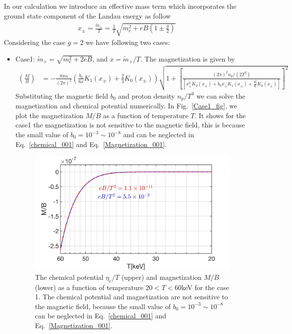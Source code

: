 \documentclass[Universe,article,submit,moreauthors,pdftex]{Definitions/mdpi}
\newcommand*{\req}[1]{Eq.~{\eqref{#1}}}
\newcommand*{\rf}[1]{Fig.~{\ref{#1}}}
\begin{document}
In our calculation we introduce an effective mass term which incorporates the ground state component of the Landau energy as follow
\begin{align}
x_\pm=\frac{\tilde{m}_\pm}{T}=\frac{1}{T}\sqrt{m^2_e+eB\left(1\pm\frac{g}{2}\right)}
\end{align}
Considering the case $g=2$ we have following two cases:
\begin{itemize}
  \item Case1: $\tilde m_+=\sqrt{m^2_e+2eB}$, and $x=\tilde m_+/T$. The magnetization is given by
  \begin{align}\label{Magnetization_001}
 \left(\frac{M}{B}\right)&=-\frac{8\pi\alpha}{(2\pi)^2}\left(\frac{b_0}{6x}K_1(x_\pm)+\frac{2}{3}K_0(x_\pm)\right)\sqrt{1+\left[\frac{{(2\pi)^2n_p}/{(2T^3)}}{\left[x_\pm^2K_2(x_\pm)+b_0x_\pm K_1(x_\pm)+\frac{b^2_0}{6}K_0(x_\pm)\right]}\right]^2}
   \end{align}
Substituting the magnetic field $b_0$ and proton density $n_p/T^3$  we can solve the magnetization and chemical potential numerically. In \rf{Case1_fig}, we plot the  magnetization $M/B$ as a function of temperature $T$. It shows for the case1 the magnetization is not sensitive to the magnetic field, this is because the small value of $b_0=10^{-3}\sim10^{-8}$ and can be neglected in \req{chemical_001} and \req{Magnetization_001}.
\begin{figure}[t]
\centering
\includegraphics[width=0.75\linewidth]{./plots/Magnetization_case1.jpg}
\caption{The chemical potential $\eta_{e}/T$ (upper) and magnetization $M/B$ (lower) as a function of temperature $20<T<60$keV  for the case 1. The chemical potential and magnetization are not sensitive to the magnetic field, because the small value of $b_0=10^{-3}\sim10^{-8}$ can be neglected in \req{chemical_001} and \req{Magnetization_001}. }

\end{figure}
\end{itemize}
\end{document}
